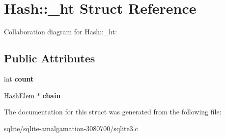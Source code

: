 \hypertarget{struct_hash_1_1__ht}{\section{Hash\+:\+:\+\_\+ht Struct Reference}
\label{struct_hash_1_1__ht}
}


Collaboration diagram for Hash\+:\+:\+\_\+ht\+:
\subsection*{Public Attributes}
\begin{DoxyCompactItemize}
\item 
\hypertarget{struct_hash_1_1__ht_a0677191178b6c7c5c6c2880f41cf24b1}{int {\bfseries count}}\label{struct_hash_1_1__ht_a0677191178b6c7c5c6c2880f41cf24b1}

\item 
\hypertarget{struct_hash_1_1__ht_a56fc145e7d38d9440d85ab2ea63a48ac}{\hyperlink{struct_hash_elem}{Hash\+Elem} $\ast$ {\bfseries chain}}\label{struct_hash_1_1__ht_a56fc145e7d38d9440d85ab2ea63a48ac}

\end{DoxyCompactItemize}


The documentation for this struct was generated from the following file\+:\begin{DoxyCompactItemize}
\item 
sqlite/sqlite-\/amalgamation-\/3080700/sqlite3.\+c\end{DoxyCompactItemize}
